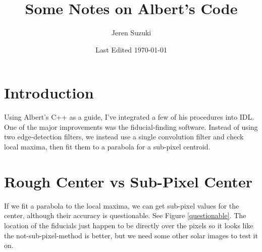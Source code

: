 \documentclass[10pt]{scrartcl}
\title{Some Notes on Albert's Code}
\author{Jeren Suzuki}
\date{Last Edited \today}
\begin{document}
\maketitle
{}
\tableofcontents
\clearpage
{}

\section{Introduction} %
\label{sec:introduction}
Using Albert's C++ as a guide, I've integrated a few of his procedures into IDL. One of the major improvements was the fiducial-finding software. Instead of using two edge-detection filters, we instead use a single convolution filter and check local maxima, then fit them to a parabola for a sub-pixel centroid. 

\section{Rough Center vs Sub-Pixel Center} %
\label{sec:rough_center_vs_sub_pixel_center}
If we fit a parabola to the local maxima, we can get sub-pixel values for the center, although their accuracy is questionable. See Figure \ref{questionable}. The location of the fiducials just happen to be directly over the pixels so it looks like the not-sub-pixel-method is better, but we need some other solar images to test it on. 
\end{document}
